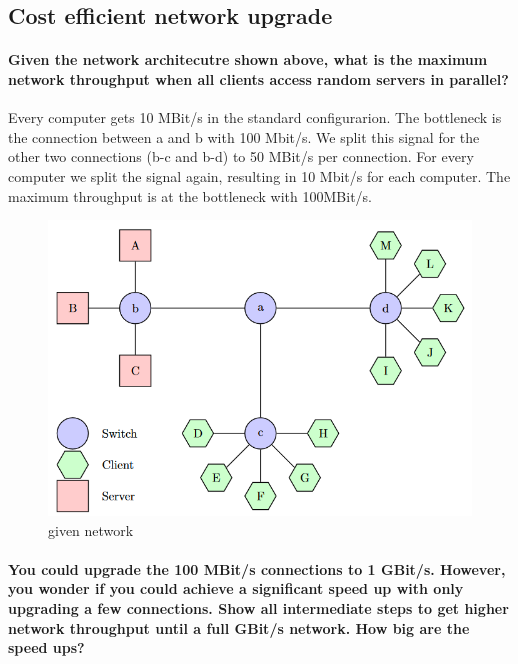 \documentclass[a4paper,12pt]{article}
\begin{document}
\pagebreak

	\subsection{Cost efficient network upgrade}
	\paragraph{Given the network architecutre shown above, what is the maximum network throughput when all clients access random servers in parallel?}
	
	
	 Every computer gets 10 MBit/s in the standard configurarion. \newline
	 The bottleneck is the connection between a and b with 100 Mbit/s. We split this signal for the other two connections (b-c and b-d) to 50 MBit/s per connection. For every computer we split the signal again, resulting in 10 Mbit/s for each computer.\newline
The maximum throughput is at the bottleneck with 100MBit/s.  
	
	\begin{figure}[ht]
		\includegraphics[width=0.7\linewidth]{network1.png}
		\caption{given network}
	\end{figure}


	\paragraph{You could upgrade the 100 MBit/s connections to 1 GBit/s.  However, you wonder if you could achieve a significant speed up with only upgrading a few connections. Show all intermediate steps to get higher network throughput until a full GBit/s network. How big are the speed ups?}	
	
\end{document}

